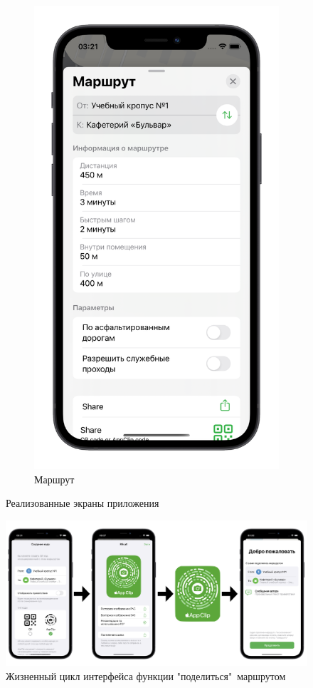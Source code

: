 \begin{figure}[H]
\begin{subfigure}[b]{0.3\textwidth}
      \includegraphics[width=\textwidth]{assets/appendix/ios-result/route.png}
      \caption{Маршрут}
    \end{subfigure}
    \caption*{Реализованные экраны приложения}
  \end{figure}


  \begin{figure}[H]
    \includegraphics[width=1\textwidth]{assets/appendix/ios-result/share.png}
    \caption*{Жизненный цикл интерфейса функции "поделиться"\ маршрутом}
  \end{figure}
